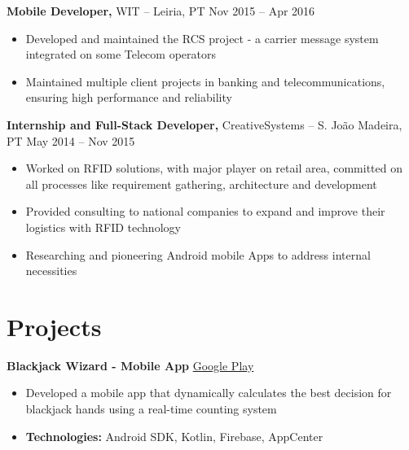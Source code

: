 \documentclass[11pt]{article}       %
\begin{document}
\textbf{Mobile Developer,} {WIT} -- Leiria, PT \hfill Nov 2015 -- Apr 2016 \\
\vspace{-9pt}
\begin{itemize}
  \item Developed and maintained the RCS project - a carrier message system integrated on some Telecom operators
  \item Maintained multiple client projects in banking and telecommunications, ensuring high performance and reliability
\end{itemize}

\textbf{Internship and Full-Stack Developer,} {CreativeSystems} -- S. João Madeira, PT \hfill May 2014 -- Nov 2015 \\
\vspace{-9pt}
\begin{itemize}
  \item Worked on RFID solutions, with major player on retail area, committed on all processes like requirement gathering, architecture and development
  \item Provided consulting to national companies to expand and improve their logistics with RFID technology
  \item Researching and pioneering Android mobile Apps to address internal necessities
\end{itemize}


\vspace{-18.5pt}

\section*{Projects}
\textbf{Blackjack Wizard - Mobile App} \hfill \href{https://play.google.com/store/apps/details?id=pt.psilva.blackjackwizard.demo&pcampaignid=web_share}{Google Play} \\
\vspace{-9pt}
\begin{itemize}
  \item Developed a mobile app that dynamically calculates the best decision for blackjack hands using a real-time counting system
  \item \textbf{Technologies:} Android SDK, Kotlin, Firebase, AppCenter
\end{itemize}
\end{document}
